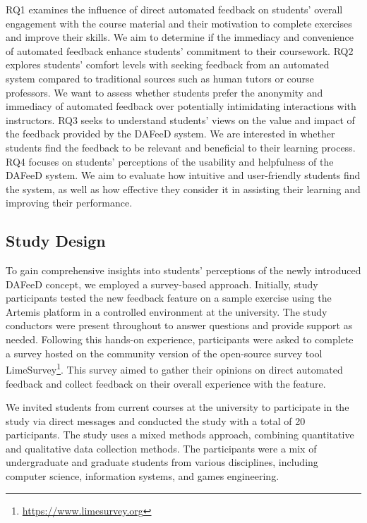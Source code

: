 \documentclass[manuscript,screen,review]{acmart}
\begin{document}
RQ1 examines the influence of direct automated feedback on students' overall engagement with the course material and their motivation to complete exercises and improve their skills.
We aim to determine if the immediacy and convenience of automated feedback enhance students' commitment to their coursework.
RQ2 explores students' comfort levels with seeking feedback from an automated system compared to traditional sources such as human tutors or course professors. 
We want to assess whether students prefer the anonymity and immediacy of automated feedback over potentially intimidating interactions with instructors.
RQ3 seeks to understand students' views on the value and impact of the feedback provided by the DAFeeD system. 
We are interested in whether students find the feedback to be relevant and beneficial to their learning process.
RQ4 focuses on students' perceptions of the usability and helpfulness of the DAFeeD system. 
We aim to evaluate how intuitive and user-friendly students find the system, as well as how effective they consider it in assisting their learning and improving their performance.

\subsection{Study Design}
To gain comprehensive insights into students' perceptions of the newly introduced DAFeeD concept, we employed a survey-based approach.
Initially, study participants tested the new feedback feature on a sample exercise using the Artemis platform in a controlled environment at the university.
The study conductors were present throughout to answer questions and provide support as needed.
Following this hands-on experience, participants were asked to complete a survey hosted on the community version of the open-source survey tool LimeSurvey\footnote{\url{https://www.limesurvey.org}}.
This survey aimed to gather their opinions on direct automated feedback and collect feedback on their overall experience with the feature.

We invited students from current courses at the university to participate in the study via direct messages and conducted the study with a total of 20 participants.
The study uses a mixed methods approach, combining quantitative and qualitative data collection methods. 
The participants were a mix of undergraduate and graduate students from various disciplines, including computer science, information systems, and games engineering.
\end{document}

